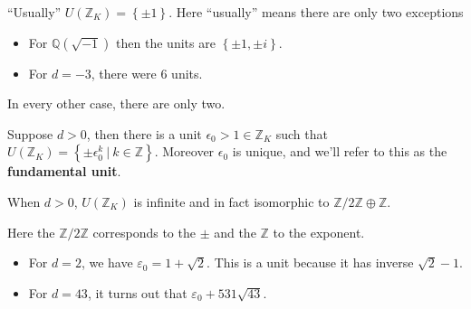 \begin{remark}

``Usually'' \(U({\mathbb{Z}}_K) = \left\{{ \pm 1 }\right\}\). Here
``usually'' means there are only two exceptions

\begin{itemize}
\item
  For \({\mathbb{Q}}( \sqrt{-1} )\) then the units are
  \(\left\{{ \pm 1, \pm i }\right\}\).
\item
  For \(d=-3\), there were 6 units.
\end{itemize}

In every other case, there are only two.

\end{remark}

\begin{proposition}[?]

Suppose \(d>0\), then there is a unit
\(\epsilon_0 > 1 \in {\mathbb{Z}}_K\) such that
\(U({\mathbb{Z}}_K) = \left\{{ \pm \epsilon_0 ^k {~\mathrel{\Big|}~}k\in {\mathbb{Z}}}\right\}\).
Moreover \(\epsilon_0\) is unique, and we'll refer to this as the
\textbf{fundamental unit}.

\end{proposition}

\begin{corollary}[?]

When \(d>0\), \(U({\mathbb{Z}}_K)\) is infinite and in fact isomorphic
to \({\mathbb{Z}}/2{\mathbb{Z}}\oplus {\mathbb{Z}}\).

\end{corollary}

\begin{remark}

Here the \({\mathbb{Z}}/2{\mathbb{Z}}\) corresponds to the \(\pm\) and
the \({\mathbb{Z}}\) to the exponent.

\end{remark}

\begin{example}[?]

\envlist

\begin{itemize}
\item
  For \(d=2\), we have \(\varepsilon_0 = 1 + \sqrt{2}\). This is a unit
  because it has inverse \(\sqrt{2} -1\).
\item
  For \(d=43\), it turns out that \(\varepsilon_0 + 531 \sqrt{43}\).
\end{itemize}

\end{example}

